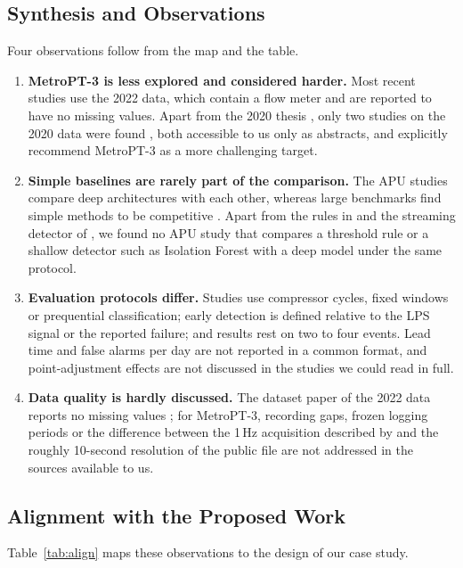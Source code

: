 \subsection{Synthesis and Observations}
Four observations follow from the map and the table.
\begin{enumerate}[label=\textbf{G\arabic*}, leftmargin=*, itemsep=3pt]
  \item \textbf{MetroPT-3 is less explored and considered harder.} Most recent studies use the 2022 data, which contain a flow meter and are reported to have no missing values. Apart from the 2020 thesis \citep{barros2020thesis}, only two studies on the 2020 data were found \citep{davari2021dsaa,davari2024explaining}, both accessible to us only as abstracts, and \citet{jakobs2025rules} explicitly recommend MetroPT-3 as a more challenging target.
  \item \textbf{Simple baselines are rarely part of the comparison.} The APU studies compare deep architectures with each other, whereas large benchmarks find simple methods to be competitive \citep{schmidl2022anomaly}. Apart from the rules in \citet{barros2020thesis} and the streaming detector of \citet{meira2023framework}, we found no APU study that compares a threshold rule or a shallow detector such as Isolation Forest with a deep model under the same protocol.
  \item \textbf{Evaluation protocols differ.} Studies use compressor cycles, fixed windows or prequential classification; early detection is defined relative to the LPS signal or the reported failure; and results rest on two to four events. Lead time and false alarms per day are not reported in a common format, and point-adjustment effects \citep{kim2022rigorous} are not discussed in the studies we could read in full.
  \item \textbf{Data quality is hardly discussed.} The dataset paper of the 2022 data reports no missing values \citep{veloso2022metropt}; for MetroPT-3, recording gaps, frozen logging periods or the difference between the 1\,Hz acquisition described by \citet{barros2020thesis} and the roughly 10-second resolution of the public file are not addressed in the sources available to us.
\end{enumerate}

\subsection{Alignment with the Proposed Work}
Table~\ref{tab:align} maps these observations to the design of our case study.

